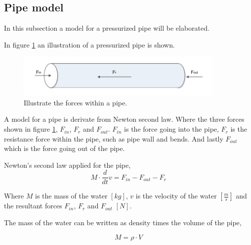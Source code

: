 
\subsection{Pipe model}\label{se:pipe_model}
In this subsection a model for a pressurized pipe will be elaborated. 

In figure \ref{fig:pipe_3d} an illustration of a pressurized pipe is shown.
\begin{figure}[H]
\centering
\includegraphics[width=0.9\textwidth]{report/modeling/pictures/pipe_3d.pdf}
\caption{Illustrate the forces within a pipe.}
\label{fig:pipe_3d}
\end{figure}


A model for a pipe is derivate from Newton second law. Where the three forces shown in figure \ref{fig:pipe_3d}, $F_{in}$, $F_r$ and $F_{out}$. $F_{in}$ is the force going into the pipe, $F_r$ is the resistance force within the pipe, such as pipe wall and bends. And lastly $F_{out}$ which is the force going out of the pipe. 

Newton's second law applied for the pipe, 
\begin{equation}\label{eq:pipe_newton}
M\cdot \frac{d}{dt}v = F_{in} - F_{out} - F_r 
\end{equation}

Where $M$ is the mass of the water $[kg]$, $v$ is the velocity of the water $\left[\frac{m}{s}\right]$ and the resultant forces $F_{in}$, $F_r$ and $F_{out}$ $[N]$.  

The mass of the water can be written as density times the volume of the pipe,

\begin{equation}
M = \rho \cdot V 
\end{equation}


